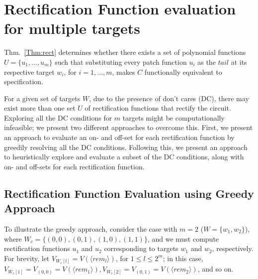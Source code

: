 \section{Rectification Function evaluation for multiple targets}\label{sec:rfunc}

Thm.~\ref{Thm:rect} determines whether there 
exists a set of polynomial functions $U = \{u_1,\dots,u_m\}$  
such that substituting every patch function $u_i$ as the $tail$ 
at its respective target $w_i$, for $i = 1,\dots,m$, makes $C$ 
functionally equivalent to specification. 

For a given set of targets $W$, due to the presence of don't cares (DC), there may exist more 
than one set $U$ of rectification functions that rectify the circuit. 
Exploring all the DC conditions for $m$ targets might be computationally infeasible; we
present two different approaches to overcome this. First,
we present an approach to evaluate an on- and off-set for each rectification function by greedily resolving all the DC conditions.
Following this, we present an approach to heuristically
explore and evaluate a subset of the DC conditions, along with 
on- and off-sets for each rectification function.



\subsection{Rectification Function Evaluation using Greedy Approach}\label{comp:GFC}

To illustrate the greedy approach, consider the case with $m = 2$ ($W = \{w_1,w_2\}$), where $W_c = \{(0,0), (0,1), (1,0), (1,1)\}$, and we must compute rectification functions $u_1$ and $u_2$ corresponding to targets $w_1$ and $w_2$, respectively. For brevity, let $V_{W_c[l]} = V(\langle rem_l \rangle)$, for $1 \leq l \leq 2^m$; in this case, $V_{W_c[1]} = V_{(0,0)} = V(\langle rem_1 \rangle ), V_{W_c[2]} = V_{(0,1)} = V(\langle rem_2 \rangle)$, and so on. 

